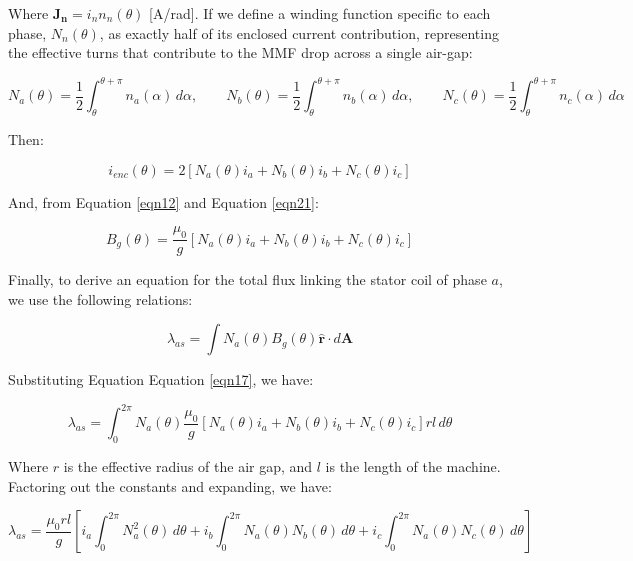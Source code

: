 \documentclass{article}
\begin{document}
Where $\mathbf{J_n} = i_n n_n(\theta)$ [A/rad]. If we define a winding function specific to each phase, $N_n(\theta)$, as exactly half of its enclosed current contribution, representing the effective turns that contribute to the MMF drop across a single air-gap:

\begin{equation}
    N_a(\theta) = \frac{1}{2} \int_{\theta}^{\theta + \pi} n_a(\alpha) \, d\alpha, \qquad
    N_b(\theta) = \frac{1}{2} \int_{\theta}^{\theta + \pi} n_b(\alpha) \, d\alpha, \qquad
    N_c(\theta) = \frac{1}{2} \int_{\theta}^{\theta + \pi} n_c(\alpha) \, d\alpha
\end{equation}

Then:

\begin{equation}
\label{eqn21}
    i_{enc}(\theta) = 2[N_a(\theta)i_a + N_b(\theta)i_b + N_c(\theta)i_c]
\end{equation}

And, from Equation \ref{eqn12} and Equation \ref{eqn21}:

\begin{equation}
\label{eqn17}
    B_g(\theta) = \frac{\mu_0}{g}[N_a(\theta)i_a + N_b(\theta)i_b + N_c(\theta)i_c]
\end{equation}

Finally, to derive an equation for the total flux linking the stator coil of phase $a$, we use the following relations:

\begin{equation}
\label{flux-eqn}
    \lambda_{as} = \int N_a(\theta) B_g(\theta)\mathbf{\hat{r}} \cdot d\mathbf{A}
\end{equation}

Substituting Equation Equation \ref{eqn17}, we have:

\begin{equation}
    \lambda_{as} = \int_{0}^{2\pi} N_a(\theta)\frac{\mu_0}{g}[N_a(\theta)i_a + N_b(\theta)i_b + N_c(\theta)i_c] r l \, d\theta
\end{equation}

Where $r$ is the effective radius of the air gap, and $l$ is the length of the machine. Factoring out the constants and expanding, we have:

\begin{equation}
    \lambda_{as} = \frac{\mu_0 r l}{g} \left[ i_a\int_{0}^{2\pi} N_a^2(\theta) \, d\theta + i_b\int_{0}^{2\pi} N_a(\theta) N_b(\theta) \, d\theta + i_c\int_{0}^{2\pi} N_a(\theta) N_c(\theta) \, d\theta \right]
\end{equation}
\end{document}
